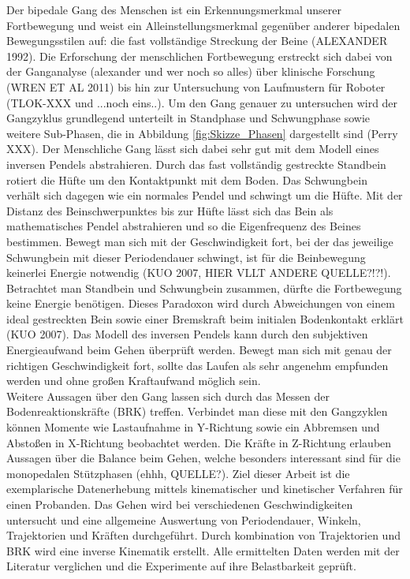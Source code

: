 Der bipedale Gang des Menschen ist ein Erkennungsmerkmal unserer Fortbewegung und weist ein Alleinstellungsmerkmal gegenüber anderer bipedalen Bewegungsstilen auf: die fast vollständige Streckung der Beine (ALEXANDER 1992). Die Erforschung der menschlichen Fortbewegung erstreckt sich dabei von der Ganganalyse (alexander und wer noch so alles) über klinische Forschung (WREN ET AL 2011) bis hin zur Untersuchung von Laufmustern für Roboter (TLOK-XXX und ...noch eins..).
Um den Gang genauer zu untersuchen wird der Gangzyklus grundlegend unterteilt in Standphase und Schwungphase sowie weitere Sub-Phasen, die in Abbildung \ref{fig:Skizze_Phasen} dargestellt sind (Perry XXX).
Der Menschliche Gang lässt sich dabei sehr gut mit dem Modell eines inversen Pendels abstrahieren. Durch das fast vollständig gestreckte Standbein rotiert die Hüfte um den Kontaktpunkt mit dem Boden. Das Schwungbein verhält sich dagegen wie ein normales Pendel und schwingt um die Hüfte. Mit der Distanz des Beinschwerpunktes bis zur Hüfte lässt sich das Bein als mathematisches Pendel abstrahieren und so die Eigenfrequenz des Beines bestimmen. Bewegt man sich mit der Geschwindigkeit fort, bei der das jeweilige Schwungbein mit dieser Periodendauer schwingt, ist für die Beinbewegung keinerlei Energie notwendig (KUO 2007, HIER VLLT ANDERE QUELLE?!?!). Betrachtet man Standbein und Schwungbein zusammen, dürfte die Fortbewegung keine Energie benötigen. Dieses Paradoxon wird durch Abweichungen von einem ideal gestreckten Bein sowie einer Bremskraft beim initialen Bodenkontakt erklärt (KUO 2007).
Das Modell des inversen Pendels kann durch den subjektiven Energieaufwand beim Gehen überprüft werden. Bewegt man sich mit genau der richtigen Geschwindigkeit fort, sollte das Laufen als sehr angenehm empfunden werden und ohne großen Kraftaufwand möglich sein.\\
Weitere Aussagen über den Gang lassen sich durch das Messen der Bodenreaktionskräfte (BRK) treffen. Verbindet man diese mit den Gangzyklen können Momente wie Lastaufnahme in Y-Richtung sowie ein Abbremsen und Abstoßen in X-Richtung beobachtet werden. Die Kräfte in Z-Richtung erlauben Aussagen über die Balance beim Gehen, welche besonders interessant sind für die monopedalen Stützphasen (ehhh, QUELLE?).
Ziel dieser Arbeit ist die exemplarische Datenerhebung mittels kinematischer und kinetischer Verfahren für einen Probanden. Das Gehen wird bei verschiedenen Geschwindigkeiten untersucht und eine allgemeine Auswertung von Periodendauer, Winkeln, Trajektorien und Kräften durchgeführt. Durch kombination von Trajektorien und BRK wird eine inverse Kinematik erstellt. Alle ermittelten Daten werden mit der Literatur verglichen und die Experimente auf ihre Belastbarkeit geprüft.

